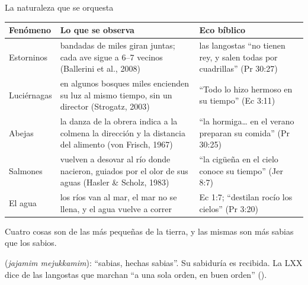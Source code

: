 \begin{frame}{La naturaleza que se orquesta}
\fontsize{6.6}{7.8}\selectfont\renewcommand{\arraystretch}{1.12}
\begin{tabular}{@{}>{\RaggedRight\arraybackslash}p{2.0cm}>{\RaggedRight\arraybackslash}p{5.2cm}>{\RaggedRight\arraybackslash}p{4.5cm}@{}}
\toprule
\textbf{Fenómeno} & \textbf{Lo que se observa} & \textbf{Eco bíblico} \\ \midrule
Estorninos & bandadas de miles giran juntas; cada ave sigue a 6--7 vecinos (Ballerini et al., 2008) & las langostas ``no tienen rey, y salen todas por cuadrillas'' (Pr 30:27) \\
Luciérnagas & en algunos bosques miles encienden su luz al mismo tiempo, sin un director (Strogatz, 2003) & ``Todo lo hizo hermoso en su tiempo'' (Ec 3:11) \\
Abejas & la danza de la obrera indica a la colmena la dirección y la distancia del alimento (von Frisch, 1967) & ``la hormiga\ldots{} en el verano preparan su comida'' (Pr 30:25) \\
Salmones & vuelven a desovar al río donde nacieron, guiados por el olor de sus aguas (Hasler \& Scholz, 1983) & ``la cigüeña en el cielo conoce su tiempo'' (Jer 8:7) \\
El agua & los ríos van al mar, el mar no se llena, y el agua vuelve a correr & Ec 1:7; ``destilan rocío los cielos'' (Pr 3:20) \\
\bottomrule
\end{tabular}\par\smallskip
\begin{cita}[fontupper=\scriptsize\itshape,before skip=2pt,after skip=2pt]Cuatro cosas son de las más pequeñas de la tierra, y las mismas son más sabias que los sabios.\end{cita}
\scriptsize{} (\emph{jajamim mejukkamim}): ``sabias, hechas sabias''. Su sabiduría es recibida. La LXX dice de las langostas que marchan ``a una sola orden, en buen orden'' ().
\end{frame}

